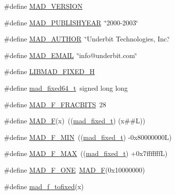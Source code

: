 \begin{DoxyCompactItemize}
\item 
\#define \hyperlink{lib-src_2libmad_2msvc_09_09_2mad_8h_ada05ce3820228a7974b7fbfa6a8ac3a2}{M\+A\+D\+\_\+\+V\+E\+R\+S\+I\+ON}
\item 
\#define \hyperlink{lib-src_2libmad_2msvc_09_09_2mad_8h_a11c58305e44a2eea0bcb291e89510feb}{M\+A\+D\+\_\+\+P\+U\+B\+L\+I\+S\+H\+Y\+E\+AR}~\char`\"{}2000-\/2003\char`\"{}
\item 
\#define \hyperlink{lib-src_2libmad_2msvc_09_09_2mad_8h_addecc1f19e32d59a7d61ce99a135161d}{M\+A\+D\+\_\+\+A\+U\+T\+H\+OR}~\char`\"{}Underbit Technologies, Inc.\char`\"{}
\item 
\#define \hyperlink{lib-src_2libmad_2msvc_09_09_2mad_8h_ad068c69e5eb1bc27489c1148e5aa57b1}{M\+A\+D\+\_\+\+E\+M\+A\+IL}~\char`\"{}info@underbit.\+com\char`\"{}
\item 
\#define \hyperlink{lib-src_2libmad_2msvc_09_09_2mad_8h_a0988464d4f3536054a7823bbd5a6fe18}{L\+I\+B\+M\+A\+D\+\_\+\+F\+I\+X\+E\+D\+\_\+H}
\item 
\#define \hyperlink{lib-src_2libmad_2msvc_09_09_2mad_8h_a283baa2bf012e39c892041bd3bc07479}{mad\+\_\+fixed64\+\_\+t}~signed long long
\item 
\#define \hyperlink{lib-src_2libmad_2msvc_09_09_2mad_8h_afe9f395501b4973ab536c13fb8235944}{M\+A\+D\+\_\+\+F\+\_\+\+F\+R\+A\+C\+B\+I\+TS}~28
\item 
\#define \hyperlink{lib-src_2libmad_2msvc_09_09_2mad_8h_a15f8a99ff8c6449921db3c15e8b80ed5}{M\+A\+D\+\_\+F}(x)~((\hyperlink{libmad_2fixed_8h_a8a4b50d6d4d6827b7a8c871db1cbfd78}{mad\+\_\+fixed\+\_\+t}) (x\#\#L))
\item 
\#define \hyperlink{lib-src_2libmad_2msvc_09_09_2mad_8h_a03929035ef601782a50acba22aaa2dac}{M\+A\+D\+\_\+\+F\+\_\+\+M\+IN}~((\hyperlink{libmad_2fixed_8h_a8a4b50d6d4d6827b7a8c871db1cbfd78}{mad\+\_\+fixed\+\_\+t}) -\/0x80000000\+L)
\item 
\#define \hyperlink{lib-src_2libmad_2msvc_09_09_2mad_8h_a67652605773e172bfd88a59f900c5b4f}{M\+A\+D\+\_\+\+F\+\_\+\+M\+AX}~((\hyperlink{libmad_2fixed_8h_a8a4b50d6d4d6827b7a8c871db1cbfd78}{mad\+\_\+fixed\+\_\+t}) +0x7fffffff\+L)
\item 
\#define \hyperlink{lib-src_2libmad_2msvc_09_09_2mad_8h_a0e0af3bf1ae6bf41e8e25eaa5606beba}{M\+A\+D\+\_\+\+F\+\_\+\+O\+NE}~\hyperlink{mac_2config_2i386_2lib-src_2libmad_2mad_8h_a15f8a99ff8c6449921db3c15e8b80ed5}{M\+A\+D\+\_\+F}(0x10000000)
\item 
\#define \hyperlink{lib-src_2libmad_2msvc_09_09_2mad_8h_a6c173fe62613adbb98f65cedeabf54e0}{mad\+\_\+f\+\_\+tofixed}(x)

\end{DoxyCompactItemize}

